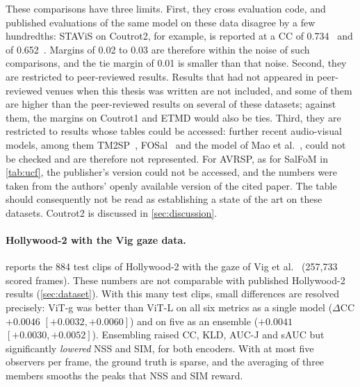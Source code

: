These comparisons have three limits. First, they cross evaluation code, and
published evaluations of the same model on these data disagree by a few
hundredths: STAViS on Coutrot2, for example, is reported at a \acrshort{CC} of
0.734~\cite{xiong2024diffsal} and of 0.652~\cite{girmaji2025minimalistic}. Margins
of 0.02 to 0.03 are therefore within the noise of such comparisons, and the tie
margin of 0.01 is smaller than that noise. Second, they are restricted to
peer-reviewed results. Results that had not appeared in peer-reviewed venues
when this thesis was written are not included, and some of them are higher than
the peer-reviewed results on several of these datasets; against them, the
margins on Coutrot1 and ETMD would also be ties. Third, they are restricted to
results whose tables could be accessed: further recent
audio-visual models, among them TM2SP~\cite{li2025tm2sp},
FOSal~\cite{yu2026fosal} and the model of Mao et al.~\cite{mao2026audio}, could
not be checked and are therefore not represented. For AVRSP, as for SalFoM in
\cref{tab:ucf}, the publisher's version could not be accessed, and the numbers
were taken from the authors' openly available version of the cited paper. The
table should consequently not be read as establishing a state of the art on
these datasets. Coutrot2 is discussed in \cref{sec:discussion}.

\paragraph{Hollywood-2 with the Vig gaze data.}  reports the
884 test clips of Hollywood-2 with the gaze of Vig et al.~\cite{vig2012space}
(257,733 scored frames). These numbers are not comparable with published
Hollywood-2 results (\cref{sec:dataset}). With this many test clips, small
differences are resolved precisely: \acrshort{ViT}-g was better than \acrshort{ViT}-L on all six
metrics as a single model ($\Delta$\acrshort{CC} $+0.0046$ $[+0.0032, +0.0060]$) and on
five as an ensemble ($+0.0041$ $[+0.0030, +0.0052]$). Ensembling raised \acrshort{CC}, \acrshort{KLD},
\acrshort{AUC-J} and \acrshort{sAUC} but significantly \emph{lowered} \acrshort{NSS} and \acrshort{SIM}, for both encoders.
With at most five observers per frame, the ground truth is sparse, and the
averaging of three members smooths the peaks that \acrshort{NSS} and \acrshort{SIM} reward.

